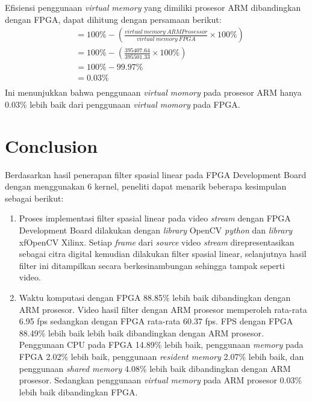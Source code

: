 Efisiensi penggunaan \textit{virtual} \textit{memory} yang dimiliki prosesor ARM dibandingkan dengan FPGA, dapat dihitung dengan persamaan berikut:
\begin{equation*}
    \begin{split}
& = 100\% - \left( \frac{virtual\ memory\ ARM Prosessor}{virtual\ memory\ FPGA} \times 100\% \right) \\
& = 100\% - \left( \frac{395407.64}{395501.33} \times 100\% \right) \\
& = 100\% - 99.97\% \\
& = 0.03\% \\
    \end{split}
\end{equation*}
Ini menunjukkan bahwa penggunaan \textit{virtual momory} pada prosesor ARM hanya 0.03\% lebih baik dari penggunaan \textit{virtual momory} pada FPGA.


\section{Conclusion}

Berdasarkan hasil penerapan filter spasial linear pada FPGA Development Board dengan menggunakan 6 kernel, peneliti dapat menarik beberapa kesimpulan sebagai berikut:
\begin{enumerate}[topsep=0pt,itemsep=0pt,partopsep=0pt, parsep=0pt]
    \item Proses implementasi filter spasial linear pada video \textit{stream} dengan FPGA Development Board dilakukan dengan \textit{library} OpenCV \textit{python} dan \textit{library} xfOpenCV Xilinx. Setiap \textit{frame} dari \textit{source} video \textit{stream} direpresentasikan sebagai citra digital kemudian dilakukan filter spasial linear, selanjutnya hasil filter ini ditampilkan secara berkesinambungan sehingga tampak seperti video.
    \item Waktu komputasi dengan FPGA 88.85\% lebih baik dibandingkan dengan ARM prosesor. Video hasil filter dengan ARM prosesor memperoleh rata-rata 6.95 fps sedangkan dengan FPGA rata-rata 60.37 fps. FPS dengan FPGA 88.49\% lebih baik lebih baik dibandingkan dengan ARM prosesor. Penggunaan CPU pada FPGA 14.89\% lebih baik, penggunaan \textit{memory} pada FPGA 2.02\% lebih baik, penggunaan \textit{resident memory} 2.07\% lebih baik, dan penggunaan \textit{shared memory} 4.08\% lebih baik dibandingkan dengan ARM prosesor. Sedangkan penggunaan \textit{virtual memory} pada ARM prosesor 0.03\% lebih baik dibandingkan FPGA.
\end{enumerate}